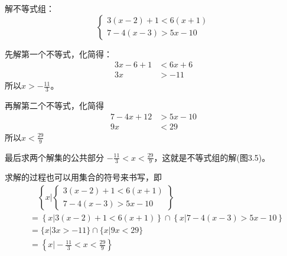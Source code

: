 \begin{example}
    解不等式组：
    \[\begin{cases}
        3(x-2)+1<6(x+1)\\
        7-4(x-3)>5x-10
    \end{cases}\]
\end{example}

\begin{solution}
    先解第一个不等式，化简得：
\[\begin{split}
    3x-6+1&<6x+6\\
    3x&>-11
\end{split}\]
所以$x>-\frac{11}{3}$。

再解第二个不等式，化简得
\[\begin{split}
    7-4x+12&>5x-10\\
    9x&<29
\end{split}\]
所以$x<\frac{29}{9}$

最后求两个解集的公共部分 $-\frac{11}{3}<x<\frac{29}{9}$，这就是不等式组的解(图3.5)。

\begin{figure}[htp]
    \centering
    \caption{}
\end{figure}

求解的过程也可以用集合的符号来书写，即
\[\begin{split}
&\quad \left\{x\Big|\begin{cases}
    3(x-2)+1<6(x+1)\\
    7-4(x-3)>5x-10
\end{cases}  \right\}\\
&=\left\{x\Big|3(x-2)+1<6(x+1) \right\} \cap \left\{x\Big|7-4(x-3)>5x-10 \right\}    \\
&=\{x|3x>-11\}\cap\{x|9x<29\}\\
&=\left\{x\Big|-\frac{11}{3}<x<\frac{29}{9} \right\}
\end{split}\]

\end{solution}

